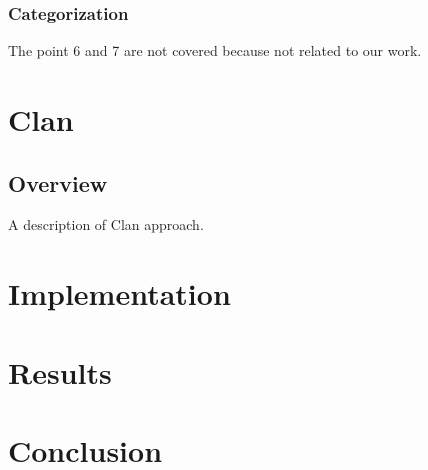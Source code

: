 \documentclass[11pt]{article} %
\begin{document}
\subsubsection{Categorization}
The point 6 and 7 are not covered because not related to our work.

\section{Clan}

\subsection{Overview}

A description of Clan approach.

\section{Implementation}

\section{Results}

\section{Conclusion}
\end{document}
